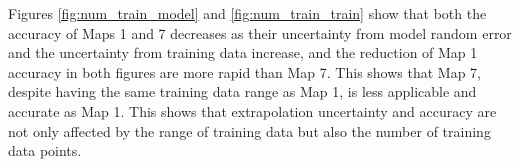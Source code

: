 Figures \ref{fig:num_train_model} and \ref{fig:num_train_train} show that both the accuracy of Maps 1 and 7 decreases as their uncertainty from model random error and the uncertainty from training data increase, and the reduction of Map 1 accuracy in both figures are more rapid than Map 7. This shows that Map 7, despite having the same training data range as Map 1, is less applicable and accurate as Map 1. This shows that extrapolation uncertainty and accuracy are not only affected by the range of training data but also the number of training data points.\\



